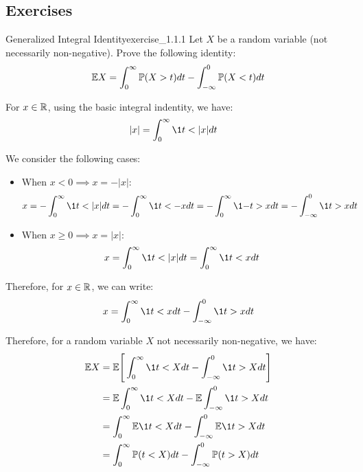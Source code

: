 \noindent\subsection*{Exercises}
\begin{exercise}{Generalized Integral Identity}{exercise_1.1.1}
    Let $X$ be a random variable (not necessarily non-negative). Prove the following identity:
    \begin{align}
        \mathbb{E} X = \int_0^\infty \mathbb{P}(X > t)dt - \int_{-\infty}^0 \mathbb{P} (X<t)dt
    \end{align}
\end{exercise}

\begin{solution*}
    For $x\in\mathbb{R}$, using the basic integral indentity, we have:
    \begin{align*}
        |x| &= \int_0^\infty \1{t < |x|}dt
    \end{align*}
    
    \noindent We consider the following cases:
    \begin{itemize}
        \item When $x < 0 \implies x = -|x|$:
        \begin{align*}
            x &= -\int_0^\infty \1{t < |x|}dt 
                = -\int_0^\infty \1{t < -x}dt = -\int_0^\infty \1{-t>x}dt = -\int_{-\infty}^0 \1{t>x}dt
        \end{align*}

        \item When $x\ge0 \implies x = |x|$:
        \begin{align*}
            x &= \int_0^\infty \1{t < |x|}dt = \int_0^\infty \1{t<x}dt
        \end{align*}
    \end{itemize}

    \noindent Therefore, for $x\in\mathbb{R}$, we can write:
    \begin{align*}
        x = \int_0^\infty \1{t<x}dt - \int_{-\infty}^0 \1{t>x}dt
    \end{align*}

    \noindent Therefore, for a random variable $X$ not necessarily non-negative, we have:
    \begin{align*}
        \E X &= \E\biggSquare{
            \int_0^\infty \1{t<X}dt - \int_{-\infty}^0 \1{t>X}dt
        } \\
        &= \E \int_0^\infty \1{t<X}dt - \E \int_{-\infty}^0 \1{t>X}dt \\
        &= \int_0^\infty \E\1{t<X}dt - \int_{-\infty}^0 \E\1{t>X}dt \\
        &= \int_0^\infty \Pm(t<X)dt - \int_{-\infty}^0 \Pm(t>X)dt
    \end{align*}
\end{solution*}

